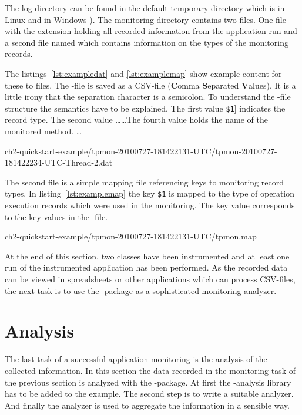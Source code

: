 \noindent The log directory can be found in the default temporary directory which is in Linux  and in Windows ). The monitoring directory contains two files. One file with the extension  holding all recorded information from the application run and a second file named  which contains information on the types of the monitoring records. 

The listings~\ref{lst:exampledat} and \ref{lst:examplemap} show example content for these to files. The -file is saved as a CSV-file (\textbf{C}omma \textbf{S}eparated \textbf{V}alues). It is a little irony that the separation character is a semicolon. To understand the -file structure the semantics have to be explained. The first value \verb!$1!] indicates the record type. The second value \ldots \ldots The fourth value holds the name of the monitored method. \ldots

\setBashListing
%
{ch2-quickstart-example/tpmon-20100727-181422131-UTC/tpmon-20100727-181422234-UTC-Thread-2.dat}

\noindent The second file is a simple mapping file referencing keys to monitoring record types. In listing~\ref{lst:examplemap} the key \verb!$1! is mapped to the type of operation execution records which were used in the monitoring. The key value corresponds to the key values in the -file.

%
{ch2-quickstart-example/tpmon-20100727-181422131-UTC/tpmon.map}

At the end of this section, two classes have been instrumented and at least one run of the instrumented application has been performed. As the recorded data can be viewed in spreadsheets or other applications which can process CSV-files, the next task is to use the \KiekerAnalysisPart{}-package as a sophisticated monitoring analyzer. 

\section{Analysis}\label{sec:example:analysis}

The last task of a successful application monitoring is the analysis of the collected information. In this section the data recorded in the monitoring task of the previous section is analyzed with the \KiekerAnalysisPart{}-package. At first the \Kieker{}-analysis library has to be added to the example. The second step is to write a suitable analyzer. And finally the analyzer is used to aggregate the information in a sensible way.

